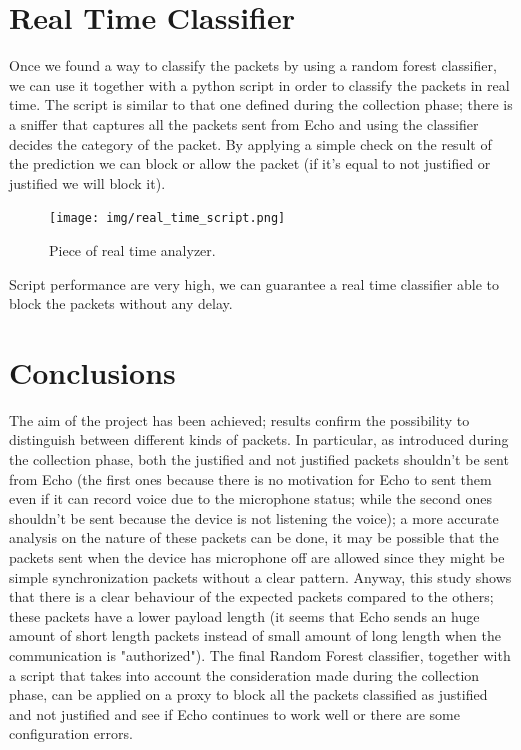 \documentclass[sigconf]{acmart}
\begin{document}
\section{Real Time Classifier}
Once we found a way to classify the packets by using a random forest classifier, we can use it together with a python script in order to classify the packets in real time. The script is similar to that one defined during the collection phase; there is a sniffer that captures all the packets sent from Echo and using the classifier decides the category of the packet.
By applying a simple check on the result of the prediction we can block or allow the packet (if it's equal to not justified or justified we will block it).
\begin{figure}[h!]
        \texttt{[image: img/real\_time\_script.png]}
        \caption{Piece of real time analyzer.}
        \label{fig:real_time_script}
    \end{figure}
Script performance are very high, we can guarantee a real time classifier able to block the packets without any delay.

    \section{Conclusions}
    The aim of the project has been achieved; results confirm the possibility to distinguish between different kinds of packets. In particular, as introduced during the collection phase, both the justified and not justified packets shouldn't be sent from Echo (the first ones because there is no motivation for Echo to sent them even if it can record voice due to the microphone status; while the second ones shouldn't be sent because the device is not listening the voice); a more accurate analysis on the nature of these packets can be done, it may be possible that the packets sent when the device has microphone off are allowed since they might be simple synchronization packets without a clear pattern. Anyway, this study shows that there is a clear behaviour of the expected packets compared to the others; these packets have a lower payload length (it seems that Echo sends an huge amount of short length packets instead of small amount of long length when the communication is "authorized").
The final Random Forest classifier, together with a script that takes into account the consideration made during the collection phase, can be applied on a proxy to block all the packets classified as justified and not justified and see if Echo continues to work well or there are some configuration errors.

    
    
\end{document}
